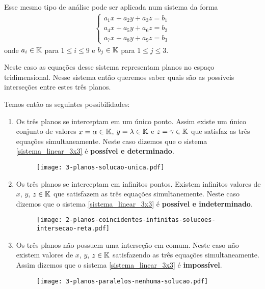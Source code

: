 Esse mesmo tipo de análise pode ser aplicada num sistema da forma
\begin{align}
    \begin{cases}\label{sistema_linear_3x3}
        a_1x + a_2y + a_3z = b_1\\
        a_4x + a_5y + a_6z = b_2\\
        a_7x + a_8y + a_9z = b_3
    \end{cases}
\end{align}
onde $a_i \in \mathbb{K}$ para $1 \le i \le 9$ e $b_j \in \mathbb{K}$ para $1 \le j \le 3$.

Neste caso as equações desse sistema representam planos no espaço tridimensional. Nesse sistema então queremos saber quais são as possíveis interseções entre estes três planos.

Temos então as seguintes possibilidades:

\begin{enumerate}
    \item Os três planos se interceptam em um único ponto. Assim existe um único conjunto de valores $x = \alpha \in \mathbb{K}$, $y = \lambda \in \mathbb{K}$ e $z = \gamma \in \mathbb{K}$  que satisfaz as três equações simultaneamente.  Neste caso dizemos que o sistema \eqref{sistema_linear_3x3}  é \textbf{possível e determinado}.
        \begin{figure}[h]
            \centering
            \texttt{[image: 3-planos-solucao-unica.pdf]}
        \end{figure}
    \item Os três planos se interceptam em infinitos pontos. Existem infinitos valores de $x$, $y$, $z \in \mathbb{K}$ que satisfazem as três equações simultanemente. Neste caso dizemos que o sistema \eqref{sistema_linear_3x3} é \textbf{possível e indeterminado}.
        \begin{figure}[h]
            \centering
            \texttt{[image: 2-planos-coincidentes-infinitas-solucoes-intersecao-reta.pdf]}
        \end{figure}
    \item Os três planos não possuem uma interseção em comum. Neste caso não existem valores de $x$, $y$, $z \in \mathbb{K}$  satisfazendo as três equações simultaneamente. Assim dizemos que o sistema \eqref{sistema_linear_3x3}  é \textbf{impossível}.
        \begin{figure}[h]
            \centering
            \texttt{[image: 3-planos-paralelos-nenhuma-solucao.pdf]}
        \end{figure}
\end{enumerate}

